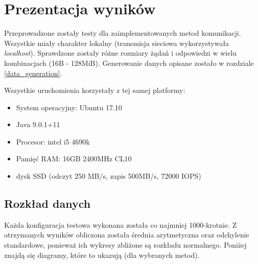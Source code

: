 \chapter{Prezentacja wyników}

Przeprowadzone zostały testy dla zaimplementowanych metod komunikacji. Wszystkie miały charakter lokalny (transmisja sieciowa wykorzystywała \textit{localhost}). Sprawdzone zostały różne rozmiary żądań i odpowiedzi w wielu kombinacjach (16B - 128MiB). Generowanie danych opisane zostało w rozdziale \ref{data_generation}.

Wszystkie uruchomienia korzystały z tej samej platformy:
\begin{itemize}
    \item System operacyjny: Ubuntu 17.10
    \item Java 9.0.1+11
    \item Procesor: intel i5 4690k
    \item Pamięć RAM: 16GB 2400MHz CL10
    \item dysk SSD (odczyt 250 MB/s, zapis 500MB/s, 72000 IOPS)
\end{itemize}


\section{Rozkład danych}

Każda konfiguracja testowa wykonana została co najmniej 1000-krotnie. Z otrzymanych wyników obliczona została średnia arytmetyczna oraz odchylenie standardowe, ponieważ ich wykresy zbliżone są rozkładu normalnego. Poniżej znajdą się diagramy, które to ukazują (dla wybranych metod).

\vspace{5mm} 


